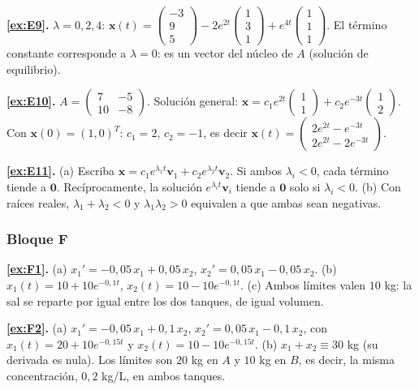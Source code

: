 \noindent\textbf{\ref{ex:E9}.} $\lambda = 0, 2, 4$: \; $\mathbf{x}(t) = \begin{pmatrix}-3\\9\\5\end{pmatrix} - 2e^{2t}\begin{pmatrix}1\\3\\1\end{pmatrix} + e^{4t}\begin{pmatrix}1\\1\\1\end{pmatrix}$. El término constante corresponde a $\lambda = 0$: es un vector del núcleo de $A$ (solución de equilibrio).

\noindent\textbf{\ref{ex:E10}.} $A = \begin{pmatrix}7&-5\\10&-8\end{pmatrix}$. Solución general: $\mathbf{x} = c_1e^{2t}\begin{pmatrix}1\\1\end{pmatrix} + c_2e^{-3t}\begin{pmatrix}1\\2\end{pmatrix}$. Con $\mathbf{x}(0) = (1,0)^T$: $c_1 = 2$, $c_2 = -1$, es decir $\mathbf{x}(t) = \begin{pmatrix}2e^{2t} - e^{-3t}\\ 2e^{2t} - 2e^{-3t}\end{pmatrix}$.

\noindent\textbf{\ref{ex:E11}.} (a) Escriba $\mathbf{x} = c_1e^{\lambda_1t}\mathbf{v}_1 + c_2e^{\lambda_2t}\mathbf{v}_2$. Si ambos $\lambda_i < 0$, cada término tiende a $\mathbf{0}$. Recíprocamente, la solución $e^{\lambda_it}\mathbf{v}_i$ tiende a $\mathbf{0}$ solo si $\lambda_i<0$. (b) Con raíces reales, $\lambda_1 + \lambda_2 < 0$ y $\lambda_1\lambda_2 > 0$ equivalen a que ambas sean negativas.

\subsubsection*{Bloque F}
\noindent\textbf{\ref{ex:F1}.} (a) $x_1' = -0{,}05\,x_1 + 0{,}05\,x_2$, \; $x_2' = 0{,}05\,x_1 - 0{,}05\,x_2$. (b) $x_1(t) = 10 + 10e^{-0{,}1t}$, \; $x_2(t) = 10 - 10e^{-0{,}1t}$. (c) Ambos límites valen $10$ kg: la sal se reparte por igual entre los dos tanques, de igual volumen.

\noindent\textbf{\ref{ex:F2}.} (a) $x_1' = -0{,}05\,x_1 + 0{,}1\,x_2$, \; $x_2' = 0{,}05\,x_1 - 0{,}1\,x_2$, con $x_1(t) = 20 + 10e^{-0{,}15t}$ y $x_2(t) = 10 - 10e^{-0{,}15t}$. (b) $x_1 + x_2 \equiv 30$ kg (su derivada es nula). Los límites son $20$ kg en $A$ y $10$ kg en $B$, es decir, la misma concentración, $0{,}2$ kg/L, en ambos tanques.
